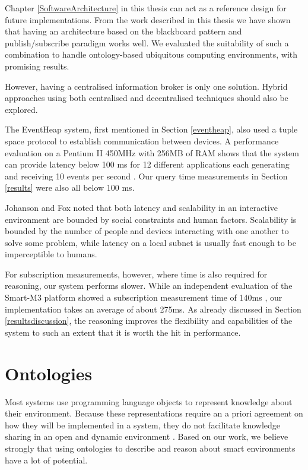 Chapter \ref{SoftwareArchitecture} in this thesis can act as a reference design for future implementations. From the work described in this thesis we have shown that having an architecture based on the blackboard pattern and publish/subscribe paradigm works well. We evaluated the suitability of such a combination to handle on\-tol\-o\-gy-based ubiquitous computing environments, with promising results.%

However, having a centralised information broker is only one solution. Hybrid approaches using both centralised and decentralised techniques should also be explored.   

The EventHeap system, first mentioned in Section \ref{eventheap}, also used a tuple space protocol to establish communication between devices. A performance evaluation on a Pentium II 450MHz with 256MB of RAM shows that the system can provide latency below 100 ms for 12 different applications each generating and receiving 10 events per second \cite{Johanson2002}. Our query time measurements in Section 
\ref{results} were also all below 100 ms.

Johanson and Fox \cite{Johanson2002} noted that both latency and scalability in an interactive environment are bounded by social constraints and human factors. Scalability is bounded by the number of people and devices interacting with one another to solve some problem, while latency on a local subnet is usually fast enough to be imperceptible to humans.

For subscription measurements, however, where time is also required for reasoning, our system performs slower. While an independent evaluation of the Smart-M3 platform showed a subscription measurement time of 140ms \cite{Etelapera2011}, our implementation takes an average of about 275ms. As already discussed in Section \ref{resultsdiscussion}, the reasoning improves the flexibility and capabilities of the system to such an extent that it is worth the hit in performance.







\section{Ontologies}

Most systems use programming language objects to represent knowledge about their environment. Because these representations require an a priori agreement on how they will be implemented in a system, they do not facilitate knowledge sharing in an open and dynamic environment \cite{Chen2004}. Based on our work, we believe strongly that using ontologies to describe and reason about smart environments have a lot of potential.  
	
